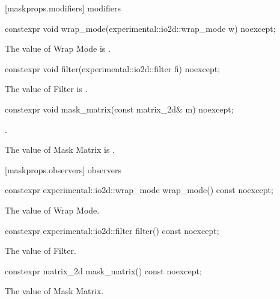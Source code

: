  [maskprops.modifiers] { modifiers}

\begin{itemdecl}
constexpr void wrap_mode(experimental::io2d::wrap_mode w) noexcept;
\end{itemdecl}
\begin{itemdescr}
\pnum
\effects
The value of Wrap Mode is .
\end{itemdescr}

\begin{itemdecl}
constexpr void filter(experimental::io2d::filter fi) noexcept;
\end{itemdecl}
\begin{itemdescr}
\pnum
\effects
The value of Filter is .
\end{itemdescr}

\begin{itemdecl}
constexpr void mask_matrix(const matrix_2d& m) noexcept;
\end{itemdecl}
\begin{itemdescr}
\pnum
\requires
{}.

\pnum
\effects
The value of Mask Matrix is .
\end{itemdescr}

 [maskprops.observers] { observers}

\begin{itemdecl}
constexpr experimental::io2d::wrap_mode wrap_mode() const noexcept;
\end{itemdecl}
\begin{itemdescr}
\pnum
\returns
The value of Wrap Mode.
\end{itemdescr}

\begin{itemdecl}
constexpr experimental::io2d::filter filter() const noexcept;
\end{itemdecl}
\begin{itemdescr}
\pnum
\returns
The value of Filter.
\end{itemdescr}

\begin{itemdecl}
constexpr matrix_2d mask_matrix() const noexcept;
\end{itemdecl}
\begin{itemdescr}
\pnum
\returns
The value of Mask Matrix.
\end{itemdescr}
